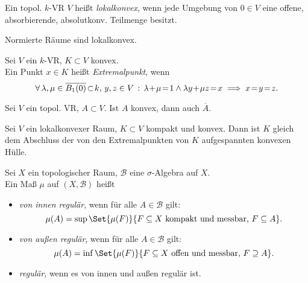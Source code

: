 \documentclass{cheat-sheet}
\newcommand{\clos}[1]{\overline{#1}} %
\newcommand{\Bor}{\mathcal{B}} %
\begin{document}
\begin{defn}
  Ein topol. $k$-VR $V$ heißt \emph{lokalkonvex}, wenn jede Umgebung von $0 \!\in\! V$ eine offene, absorbierende, absolutkonv. Teilmenge besitzt.
\end{defn}

\begin{bsp}
  Normierte Räume sind lokalkonvex.
\end{bsp}

\begin{defn}
  Sei $V$ ein $k$-VR, $K \subset V$ konvex. \\
  Ein Punkt $x \in K$ heißt \emph{Extremalpunkt}, wenn
  \[ \fa{\lambda, \mu \in \overline{B_1(0)} \!\subset\! k, \, y, z \in V} \lambda \!+\! \mu \!=\! 1 \wedge \lambda y \!+\! \mu z \!=\! x \implies x \!=\! y \!=\! z. \]
  \iffalse
  \begin{align*}
    & \fa{y_i, \ldots, y_k \in K, \, \lambda_1, \ldots, \lambda_k \in \cinterval{0}{1}} \\
    & \lambda_1 + \nldots + \lambda_k = 1 \,\wedge\, \lambda_1 y_1 + \nldots + \lambda_k y_k = x \implies y_1 \!=\! \nldots \!=\! y_k = x.
  \end{align*}
  \fi
\end{defn}

\begin{lem}
  Sei $V$ ein topol. VR, $A \subset V$. Ist $A$ konvex, dann auch $\clos{A}$.
\end{lem}

\begin{satz}
  Sei $V$ ein lokalkonvexer Raum, $K \subset V$ kompakt und konvex. Dann ist $K$ gleich dem Abschluss der von den Extremalpunkten von $K$ aufgespannten konvexen Hülle.
\end{satz}

\begin{defn}
  Sei $X$ ein topologischer Raum, $\Bor$ eine $\sigma$-Algebra auf $X$. \\
  Ein Maß $\mu$ auf $(X, \Bor)$ heißt
  \begin{itemize}
    \item \emph{von innen regulär}, wenn für alle $A \in \Bor$ gilt:
    \[ \mu(A) = \sup \Set{\mu(F)}{F \subseteq X \text{ kompakt und messbar, } F \subseteq A}. \]
    \item \emph{von außen regulär}, wenn für alle $A \in \Bor$ gilt:
    \[ \mu(A) = \inf \Set{\mu(F)}{F \subseteq X \text{ offen und messbar, } F \supseteq A}. \]
    \item \emph{regulär}, wenn es von innen und außen regulär ist.
  \end{itemize}
\end{defn}
\end{document}
